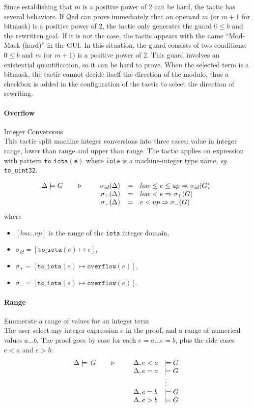 Since establishing that $m$ is a positive power of 2 can be hard, the tactic has
several behaviors. If \textsf{Qed} can prove immediately that an operand $m$ (or
$m+1$ for bitmask) is a positive power of 2, the tactic only generates the guard
$0 \leq b$ and the rewritten goal. If it is not the case, the tactic appears
with the name ``Mod-Mask (hard)'' in the GUI. In this situation, the guard
consists of two conditions: $0 \leq b$ and $m$ (or $m+1$) is a positive power of
2. This guard involves an existential quantification, so it can be hard to
prove. When the selected term is a bitmask, the tactic cannot decide itself the
direction of the modulo, thus a checkbox is added in the configuration of the
tactic to select the direction of rewriting.

\paragraph{Overflow} Integer Conversions \\
This tactic split machine integer conversions into three cases: value in integer
range, lower than range and upper than range. The tactic applies on expression
with pattern $\mathtt{to\_iota(e)}$ where \texttt{iota} is a machine-integer type
name, \emph{eg.} \texttt{to\_uint32}.

\[\TACTIC{\Delta\models G}{%
\begin{array}[t]{rcl}
\sigma_{id}(\Delta) & \models & low \leq e \leq up \Rightarrow \sigma_{id}(G) \\
\sigma_{+}(\Delta) & \models & low < e \Rightarrow \sigma_{+}(G) \\
\sigma_{-}(\Delta) & \models & e < up \Rightarrow \sigma_{-}(G)
\end{array}
}\]
where
\begin{itemize}
  \item $[low..up]$ is the range of the \texttt{iota} integer domain,
  \item $\sigma_{id} = [ \mathtt{to\_iota}(e) \mapsto e ]$,
  \item $\sigma_{+}  = [ \mathtt{to\_iota}(e) \mapsto \mathtt{overflow}(e) ]$,
  \item $\sigma_{-}  = [ \mathtt{to\_iota}(e) \mapsto \mathtt{overflow}(e) ]$.
\end{itemize}

\paragraph{Range} Enumerate a range of values for an integer term\\
The user select any integer expression $e$ in the proof, and a range of numerical values $a\ldots b$. The proof goes by case for each $e=a\ldots e=b$, plus the side cases $e<a$ and $e>b$:
$$\TACTIC{\Delta\models\,G}{%
\begin{array}[t]{ll}
\Delta,e<a &\models G \\
\Delta,e=a &\models G \\
&\vdots \\
\Delta,e=b &\models G \\
\Delta,e>b &\models G
\end{array}} $$

